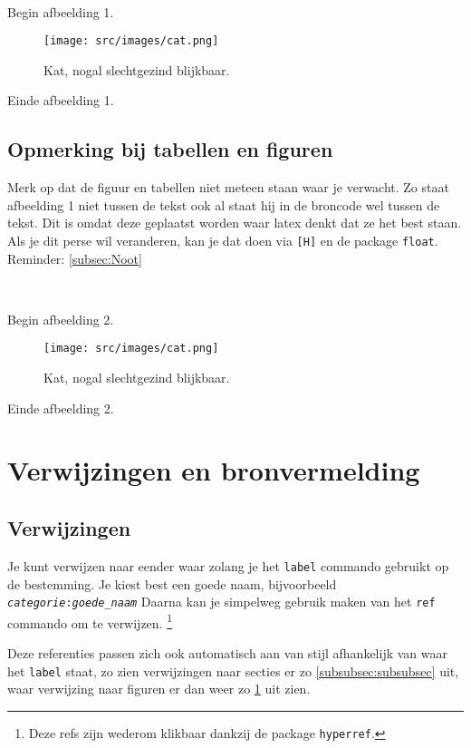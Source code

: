 \documentclass{article} %
\begin{document}
			\
			
			Begin afbeelding 1.
			\begin{figure}
				\centering
				\texttt{[image: src/images/cat.png]}
				\caption{Kat, nogal slechtgezind blijkbaar.}
				\label{fig:kat}
			\end{figure}
			Einde afbeelding 1.
			
		\subsection{Opmerking bij tabellen en figuren}
			Merk op dat de figuur en tabellen niet meteen staan waar je verwacht. Zo staat afbeelding 1 niet tussen de tekst ook al staat hij in de broncode wel tussen de tekst. Dit is omdat deze geplaatst worden waar latex denkt dat ze het best staan. 
			Als je dit perse wil veranderen, kan je dat doen via \texttt{[H]} en de package \texttt{float}.
			Reminder: \ref{subsec:Noot}
		
			\
		
			Begin afbeelding 2.
			\begin{figure}[H]
				\centering
				\texttt{[image: src/images/cat.png]}
				\caption{Kat, nogal slechtgezind blijkbaar.}
				\label{fig:kat2}
			\end{figure}
			Einde afbeelding 2.
			
	\section{Verwijzingen en bronvermelding}
		\label{sec:verwijzingenBronvermelding}
		
		\subsection{Verwijzingen}
			Je kunt verwijzen naar eender waar zolang je het \texttt{label} commando gebruikt op de bestemming.
			Je kiest best een goede naam, bijvoorbeeld \texttt{\textit{categorie}:\textit{goede\_naam}}
			Daarna kan je simpelweg gebruik maken van het \texttt{ref} commando om te verwijzen.
			\footnote{Deze refs zijn wederom klikbaar dankzij de package \texttt{hyperref}.}
			
			Deze referenties passen zich ook automatisch aan van stijl afhankelijk van waar het \texttt{label} staat, zo zien verwijzingen naar secties er zo \ref{subsubsec:subsubsec} uit, waar verwijzing naar figuren er dan weer zo \ref{fig:kat} uit zien.
			
\end{document}
